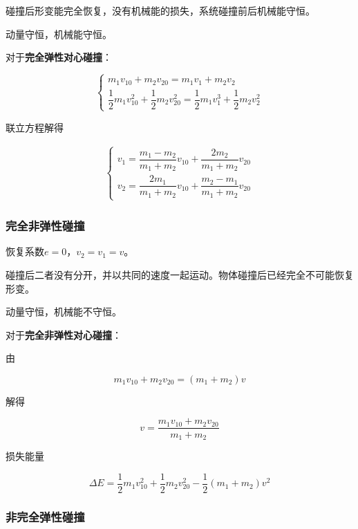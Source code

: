 \documentclass[
	12pt, %
	a4paper, %
]{myLegrandOrangeBook}
\begin{document}
碰撞后形变能完全恢复，没有机械能的损失，系统碰撞前后机械能守恒。

动量守恒，机械能守恒。

对于\textbf{完全弹性对心碰撞}：

$$
    \left\{\begin{array}{l}
    m_1 v_{10}+m_2 v_{20}=m_1 v_1+m_2 v_2 \\
    \dfrac{1}{2} m_1 v_{10}^2+\dfrac{1}{2} m_2 v_{20}^2=\dfrac{1}{2} m_1 v_1^3+\dfrac{1}{2} m_2 v_2^2
    \end{array}\right.
$$

联立方程解得

\begin{align}
    \left\{\begin{array}{l}
        v_1=\dfrac{m_1-m_2}{m_1+m_2} v_{10}+\dfrac{2 m_2}{m_1+m_2} v_{20} \\
        v_2=\dfrac{2 m_1}{m_1+m_2} v_{10}+\dfrac{m_2-m_1}{m_1+m_2} v_{20}
    \end{array}\right.
\end{align}

\subsubsection{完全非弹性碰撞}

恢复系数\(e=0\)，\(v_2=v_1=v\)。

碰撞后二者没有分开，并以共同的速度一起运动。物体碰撞后已经完全不可能恢复形变。

动量守恒，机械能不守恒。

对于\textbf{完全非弹性对心碰撞}：

由

$$
    m_1 v_{10}+m_2 v_{20}=\left(m_1+m_2\right) v
$$

解得

\begin{equation}
    v=\frac{m_1 v_{10}+m_2 v_{20}}{m_1+m_2}
\end{equation}

损失能量

\begin{equation}
    \Delta E=\frac{1}{2} m_1 v_{10}^2+\frac{1}{2} m_2 v_{20}^2-\frac{1}{2}\left(m_1+m_2\right) v^2
\end{equation}

\subsubsection{非完全弹性碰撞}
\end{document}
